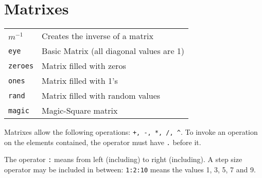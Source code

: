 \section{Matrixes}
\begin{tabular}{@{}p{\the\MyLenA}%
		@{}p{\linewidth-\the\MyLenA}}
  $m^{-1}$ & Creates the inverse of a matrix\\
  \texttt{eye}& Basic Matrix (all diagonal values are 1)\\
  \texttt{zeroes}& Matrix filled with zeros\\
  \texttt{ones} & Matrix filled with 1's\\
  \texttt{rand} & Matrix filled with random values\\
  \texttt{magic} & Magic-Square matrix\\
\end{tabular}

Matrixes allow the following operations: \texttt{+, -, *, /, \^}.
To invoke an operation on the elements contained, the operator must have \texttt{.} before it.

The operator \texttt{:} means from left (including) to right (including).
A step size operator may be included in between: \texttt{1:2:10} means the values 1, 3, 5, 7 and 9.